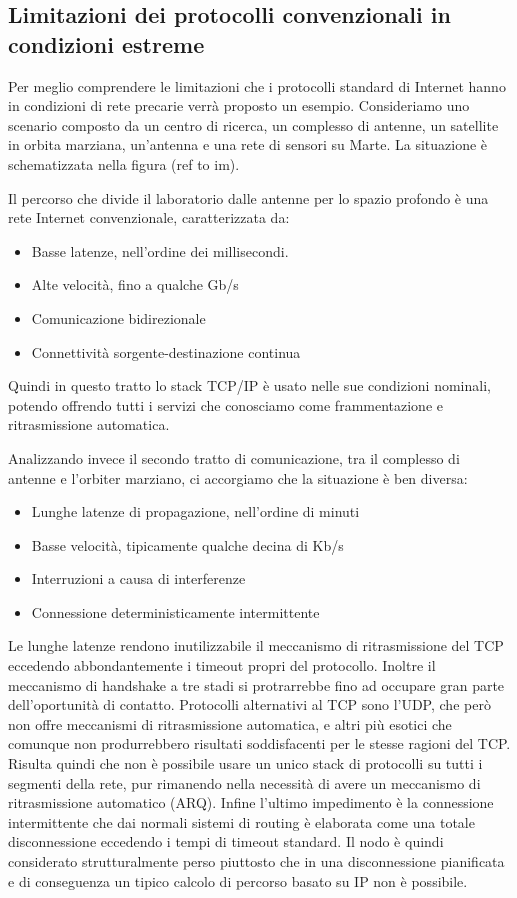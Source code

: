 \documentclass[a4paper]{article}
\begin{document}
		\subsection{Limitazioni dei protocolli convenzionali in condizioni estreme}
		
		Per meglio comprendere le limitazioni che i protocolli standard di Internet hanno in condizioni di rete precarie verrà proposto un esempio. Consideriamo uno scenario composto da un centro di ricerca, un complesso di antenne, un satellite in orbita marziana, un'antenna e una rete di sensori su Marte. La situazione è schematizzata nella figura (ref to im). 
		
		Il percorso che divide il laboratorio dalle antenne per lo spazio profondo è una rete Internet convenzionale, caratterizzata da:
		\begin{itemize}
			\item Basse latenze, nell'ordine dei millisecondi.
			\item Alte velocità, fino a qualche Gb/s
			\item Comunicazione bidirezionale
			\item Connettività sorgente-destinazione continua
		\end{itemize}
		Quindi in questo tratto lo stack TCP/IP è usato nelle sue condizioni nominali, potendo offrendo tutti i servizi che conosciamo come frammentazione e ritrasmissione automatica. 
		
		Analizzando invece il secondo tratto di comunicazione, tra il complesso di antenne e l'orbiter marziano, ci accorgiamo che la situazione è ben diversa:
		\begin{itemize}
			\item Lunghe latenze di propagazione, nell'ordine di minuti
			\item Basse velocità, tipicamente qualche decina di Kb/s
			\item Interruzioni a causa di interferenze
			\item Connessione deterministicamente intermittente
		\end{itemize}
		Le lunghe latenze rendono inutilizzabile il meccanismo di ritrasmissione del TCP eccedendo abbondantemente i timeout propri del protocollo. Inoltre il meccanismo di handshake a tre stadi si protrarrebbe fino ad occupare gran parte dell'oportunità di contatto. Protocolli alternativi al TCP sono l'UDP, che però non offre meccanismi di ritrasmissione automatica, e altri più esotici che comunque non produrrebbero risultati soddisfacenti per le stesse ragioni del TCP.
		Risulta quindi che non è possibile usare un unico stack di protocolli su tutti i segmenti della rete, pur rimanendo nella necessità di avere un meccanismo di ritrasmissione automatico (ARQ). 
		Infine l'ultimo impedimento è la connessione intermittente che dai normali sistemi di routing è elaborata come una totale disconnessione eccedendo i tempi di timeout standard. Il nodo è quindi considerato strutturalmente perso piuttosto che in una disconnessione pianificata e di conseguenza un tipico calcolo di percorso basato su IP non è possibile.
		
\end{document}
